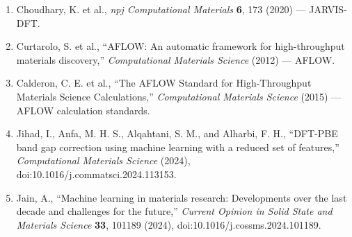 \documentclass[10pt, a4paper]{article}
\begin{document}
\begin{enumerate}
  \item Choudhary, K. et al., \textit{npj Computational Materials} \textbf{6}, 173 (2020) --- JARVIS-DFT.
  \item Curtarolo, S. et al., ``AFLOW: An automatic framework for high-throughput materials discovery,'' \textit{Computational Materials Science} (2012) --- AFLOW.
  \item Calderon, C. E. et al., ``The AFLOW Standard for High-Throughput Materials Science Calculations,'' \textit{Computational Materials Science} (2015) --- AFLOW calculation standards.
  \item Jihad, I., Anfa, M. H. S., Alqahtani, S. M., and Alharbi, F. H., ``DFT-PBE band gap correction using machine learning with a reduced set of features,'' \textit{Computational Materials Science} (2024), doi:10.1016/j.commatsci.2024.113153.
  \item Jain, A., ``Machine learning in materials research: Developments over the last decade and challenges for the future,'' \textit{Current Opinion in Solid State and Materials Science} \textbf{33}, 101189 (2024), doi:10.1016/j.cossms.2024.101189.
\end{enumerate}
\end{document}
